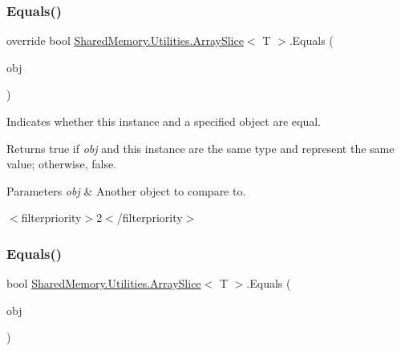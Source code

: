 \subsubsection{\texorpdfstring{Equals()}{Equals()}\hspace{0.1cm}{\footnotesize\ttfamily [1/2]}}
{\footnotesize\ttfamily override bool \hyperlink{struct_shared_memory_1_1_utilities_1_1_array_slice}{Shared\+Memory.\+Utilities.\+Array\+Slice}$<$ T $>$.Equals (\begin{DoxyParamCaption}\item[{Object}]{obj }\end{DoxyParamCaption})\hspace{0.3cm}{\ttfamily [inline]}}



Indicates whether this instance and a specified object are equal.

\begin{DoxyReturn}{Returns}
true if {\itshape obj}  and this instance are the same type and represent the same value; otherwise, false.
\end{DoxyReturn}

\begin{DoxyParams}{Parameters}
{\em obj} & Another object to compare to. \\
\hline
\end{DoxyParams}
$<$filterpriority$>$2$<$/filterpriority$>$ \mbox{\label{struct_shared_memory_1_1_utilities_1_1_array_slice_a0a70e0cbe83928a24c41b387bfc7fa03}} 
\subsubsection{\texorpdfstring{Equals()}{Equals()}\hspace{0.1cm}{\footnotesize\ttfamily [2/2]}}
{\footnotesize\ttfamily bool \hyperlink{struct_shared_memory_1_1_utilities_1_1_array_slice}{Shared\+Memory.\+Utilities.\+Array\+Slice}$<$ T $>$.Equals (\begin{DoxyParamCaption}\item[{\hyperlink{struct_shared_memory_1_1_utilities_1_1_array_slice}{Array\+Slice}$<$ T $>$}]{obj }\end{DoxyParamCaption})\hspace{0.3cm}{\ttfamily [inline]}}



